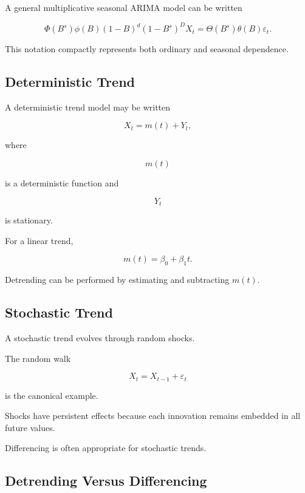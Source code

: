A general multiplicative seasonal ARIMA model can be written

\[
\boxed{
\Phi
(
B^s
)
\phi(B)
(
1-B
)^d
(
1-B^s
)^D
X_t
=
\Theta
(
B^s
)
\theta(B)
\varepsilon_t.
}
\]

This notation compactly represents both ordinary and seasonal
dependence.

\subsection{Deterministic Trend}
\label{subsec:deterministic-trend}

A deterministic trend model may be written

\[
\boxed{
X_t
=
m(t)
+
Y_t,
}
\]

where

\[
m(t)
\]

is a deterministic function and

\[
Y_t
\]

is stationary.

For a linear trend,

\[
\boxed{
m(t)
=
\beta_0+\beta_1t.
}
\]

Detrending can be performed by estimating and subtracting \(m(t)\).

\subsection{Stochastic Trend}
\label{subsec:stochastic-trend}

A stochastic trend evolves through random shocks.

The random walk

\[
X_t
=
X_{t-1}
+
\varepsilon_t
\]

is the canonical example.

Shocks have persistent effects because each innovation remains embedded
in all future values.

Differencing is often appropriate for stochastic trends.

\subsection{Detrending Versus Differencing}
\label{subsec:detrending-versus-differencing}

